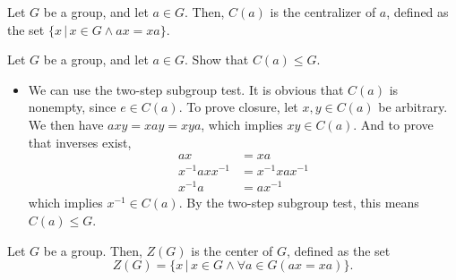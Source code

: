     \begin{dfn}[Centralizer]
        Let \(G\) be a group, and let \(a\in G\). Then, \(C(a)\) is the centralizer of \(a\), defined as the set \(\{x\,|\, x\in G \land ax = xa\}\).
    \end{dfn}

    \begin{example}
        Let \(G\) be a group, and let \(a\in G\). Show that \(C(a) \leq G\).

        \begin{itemize}
            \item We can use the two-step subgroup test. It is obvious that \(C(a)\) is nonempty, since \(e\in C(a)\). To prove closure, let \(x,y\in C(a)\) be arbitrary. We then have \(axy = xay = xya\), which implies \(xy\in C(a)\). And to prove that inverses exist, 
            \begin{align*}
                ax &= xa \\
                x^{-1}axx^{-1} &= x^{-1}xax^{-1} \\
                x^{-1}a &= ax^{-1}
            \end{align*}
            which implies \(x^{-1}\in C(a)\). By the two-step subgroup test, this means \(C(a) \leq G\).
        \end{itemize}
    \end{example}

    \begin{dfn}[Center]
        Let \(G\) be a group. Then, \(Z(G)\) is the center of \(G\), defined as the set \[Z(G) = \{x\,|\, x\in G \land \forall a\in G (ax = xa)\}.\]
    \end{dfn}